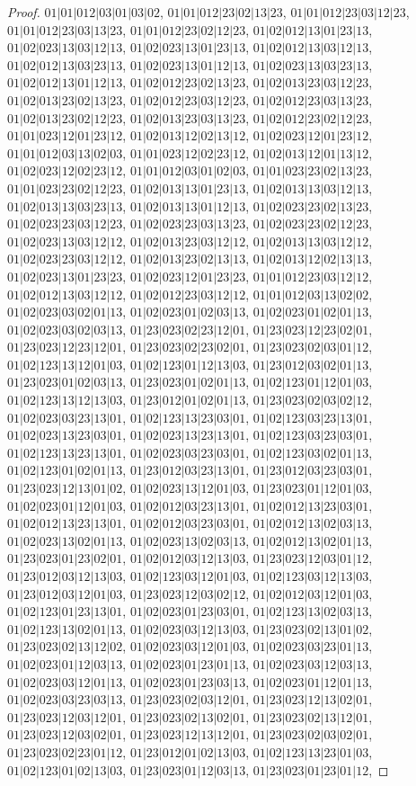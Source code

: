 \documentclass[12pt]{article}
\theoremstyle{plain}
\theoremstyle{definition}
\theoremstyle{remark}
\begin{document}
\begin{proof}
$01|01|012|03|01|03|02$, $01|01|012|23|02|13|23$, $01|01|012|23|03|12|23$, $01|01|012|23|03|13|23$, $01|01|012|23|02|12|23$, $01|02|012|13|01|23|13$, $01|02|023|13|03|12|13$, $01|02|023|13|01|23|13$, $01|02|012|13|03|12|13$, $01|02|012|13|03|23|13$, $01|02|023|13|01|12|13$, $01|02|023|13|03|23|13$, $01|02|012|13|01|12|13$, $01|02|012|23|02|13|23$, $01|02|013|23|03|12|23$, $01|02|013|23|02|13|23$, $01|02|012|23|03|12|23$, $01|02|012|23|03|13|23$, $01|02|013|23|02|12|23$, $01|02|013|23|03|13|23$, $01|02|012|23|02|12|23$, $01|01|023|12|01|23|12$, $01|02|013|12|02|13|12$, $01|02|023|12|01|23|12$, $01|01|012|03|13|02|03$, $01|01|023|12|02|23|12$, $01|02|013|12|01|13|12$, $01|02|023|12|02|23|12$, $01|01|012|03|01|02|03$, $01|01|023|23|02|13|23$, $01|01|023|23|02|12|23$, $01|02|013|13|01|23|13$, $01|02|013|13|03|12|13$, $01|02|013|13|03|23|13$, $01|02|013|13|01|12|13$, $01|02|023|23|02|13|23$, $01|02|023|23|03|12|23$, $01|02|023|23|03|13|23$, $01|02|023|23|02|12|23$, $01|02|023|13|03|12|12$, $01|02|013|23|03|12|12$, $01|02|013|13|03|12|12$, $01|02|023|23|03|12|12$, $01|02|013|23|02|13|13$, $01|02|013|12|02|13|13$, $01|02|023|13|01|23|23$, $01|02|023|12|01|23|23$, $01|01|012|23|03|12|12$, $01|02|012|13|03|12|12$, $01|02|012|23|03|12|12$, $01|01|012|03|13|02|02$, $01|02|023|03|02|01|13$, $01|02|023|01|02|03|13$, $01|02|023|01|02|01|13$, $01|02|023|03|02|03|13$, $01|23|023|02|23|12|01$, $01|23|023|12|23|02|01$, $01|23|023|12|23|12|01$, $01|23|023|02|23|02|01$, $01|23|023|02|03|01|12$, $01|02|123|13|12|01|03$, $01|02|123|01|12|13|03$, $01|23|012|03|02|01|13$, $01|23|023|01|02|03|13$, $01|23|023|01|02|01|13$, $01|02|123|01|12|01|03$, $01|02|123|13|12|13|03$, $01|23|012|01|02|01|13$, $01|23|023|02|03|02|12$, $01|02|023|03|23|13|01$, $01|02|123|13|23|03|01$, $01|02|123|03|23|13|01$, $01|02|023|13|23|03|01$, $01|02|023|13|23|13|01$, $01|02|123|03|23|03|01$, $01|02|123|13|23|13|01$, $01|02|023|03|23|03|01$, $01|02|123|03|02|01|13$, $01|02|123|01|02|01|13$, $01|23|012|03|23|13|01$, $01|23|012|03|23|03|01$, $01|23|023|12|13|01|02$, $01|02|023|13|12|01|03$, $01|23|023|01|12|01|03$, $01|02|023|01|12|01|03$, $01|02|012|03|23|13|01$, $01|02|012|13|23|03|01$, $01|02|012|13|23|13|01$, $01|02|012|03|23|03|01$, $01|02|012|13|02|03|13$, $01|02|023|13|02|01|13$, $01|02|023|13|02|03|13$, $01|02|012|13|02|01|13$, $01|23|023|01|23|02|01$, $01|02|012|03|12|13|03$, $01|23|023|12|03|01|12$, $01|23|012|03|12|13|03$, $01|02|123|03|12|01|03$, $01|02|123|03|12|13|03$, $01|23|012|03|12|01|03$, $01|23|023|12|03|02|12$, $01|02|012|03|12|01|03$, $01|02|123|01|23|13|01$, $01|02|023|01|23|03|01$, $01|02|123|13|02|03|13$, $01|02|123|13|02|01|13$, $01|02|023|03|12|13|03$, $01|23|023|02|13|01|02$, $01|23|023|02|13|12|02$, $01|02|023|03|12|01|03$, $01|02|023|03|23|01|13$, $01|02|023|01|12|03|13$, $01|02|023|01|23|01|13$, $01|02|023|03|12|03|13$, $01|02|023|03|12|01|13$, $01|02|023|01|23|03|13$, $01|02|023|01|12|01|13$, $01|02|023|03|23|03|13$, $01|23|023|02|03|12|01$, $01|23|023|12|13|02|01$, $01|23|023|12|03|12|01$, $01|23|023|02|13|02|01$, $01|23|023|02|13|12|01$, $01|23|023|12|03|02|01$, $01|23|023|12|13|12|01$, $01|23|023|02|03|02|01$, $01|23|023|02|23|01|12$, $01|23|012|01|02|13|03$, $01|02|123|13|23|01|03$, $01|02|123|01|02|13|03$, $01|23|023|01|12|03|13$, $01|23|023|01|23|01|12$, 
\end{proof}
\end{document}
